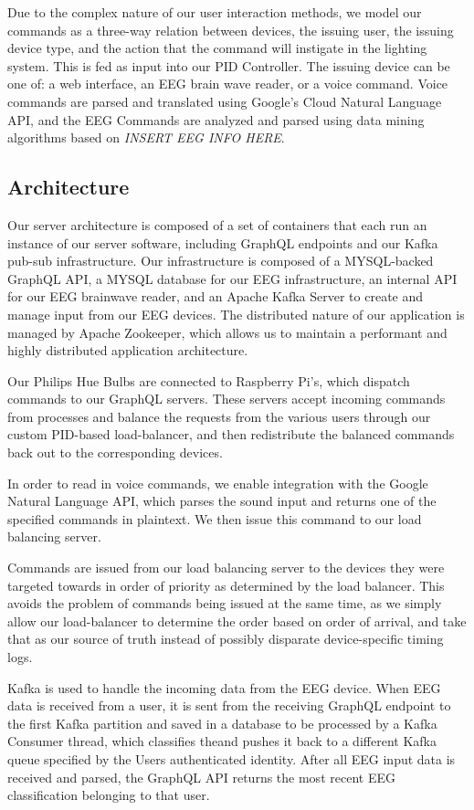 \documentclass[10pt,twocolumn,letterpaper]{article}
\begin{document}
Due to the complex nature of our user interaction methods, we model our commands
as a three-way relation between devices, the issuing user, the issuing device
type, and the action that the command will instigate in the lighting system.
This is fed as input into our PID Controller. The issuing device can be one of:
a web interface, an EEG brain wave reader, or a voice command. Voice commands
are parsed and translated using Google's Cloud Natural Language API, and the EEG
Commands are analyzed and parsed using data mining algorithms based on
\emph{INSERT EEG INFO HERE}.

\subsection{Architecture}
Our server architecture is composed of a set of containers that each run an
instance of our server software, including GraphQL endpoints and our Kafka
pub-sub infrastructure. Our infrastructure is composed of a MYSQL-backed GraphQL
API, a MYSQL database for our EEG infrastructure, an internal API for our EEG
brainwave reader, and an Apache Kafka Server to create and manage input from our
EEG devices. The distributed nature of our application is managed by Apache
Zookeeper, which allows us to maintain a performant and highly distributed
application architecture.

Our Philips Hue Bulbs are connected to Raspberry Pi's, which dispatch commands to
our GraphQL servers. These servers accept incoming commands from processes and
balance the requests from the various users through our custom PID-based
load-balancer, and then redistribute the balanced commands back out to the
corresponding devices.

In order to read in voice commands, we enable integration with the Google
Natural Language API, which parses the sound input and returns one of the
specified commands in plaintext. We then issue this command to our load
balancing server.

Commands are issued from our load balancing server to the devices they were
targeted towards in order of priority as determined by the load balancer. This
avoids the problem of commands being issued at the same time, as we simply allow
our load-balancer to determine the order based on order of arrival, and take
that as our source of truth instead of possibly disparate device-specific timing
logs.

Kafka is used to handle the incoming data from the EEG device. When EEG data is
received from a user, it is sent from the receiving GraphQL endpoint to the
first Kafka partition and saved in a database to be processed by a Kafka
Consumer thread, which classifies theand pushes it back to a different
Kafka queue specified by the Users authenticated identity. After all EEG input
data is received and parsed, the GraphQL API returns the most recent EEG
classification belonging to that user.
\end{document}
